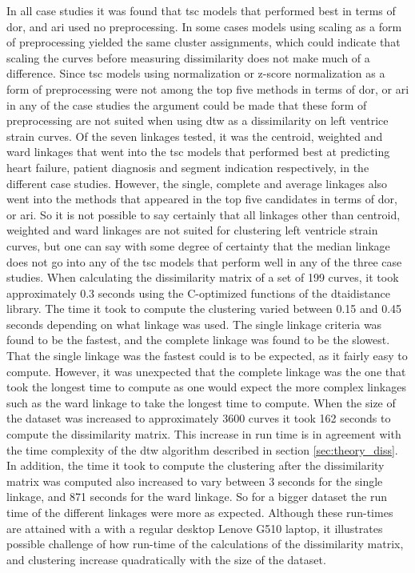 In all case studies it was found that \acrshort{tsc} models that performed best in terms of \acrshort{dor}, and \acrshort{ari} used no preprocessing. In some cases models using scaling as a form of preprocessing yielded the same cluster assignments, which could indicate that scaling the curves before measuring dissimilarity does not make much of a difference. Since \acrshort{tsc} models using normalization or z-score normalization as a form of preprocessing were not among the top five methods in terms of \acrshort{dor}, or \acrshort{ari} in any of the case studies the argument could be made that these form of preprocessing are not suited when using \acrshort{dtw} as a dissimilarity on left ventrice strain curves. \bigskip
Of the seven linkages tested, it was the centroid, weighted and ward linkages that went into the \acrshort{tsc} models that performed best at predicting heart failure, patient diagnosis and segment indication respectively, in the different case studies. However, the single, complete and average linkages also went into the methods that appeared in the top five candidates in terms of \acrshort{dor}, or \acrshort{ari}. So it is not possible to say certainly that all linkages other than centroid, weighted and ward linkages are not suited for clustering left ventricle strain curves, but one can say with some degree of certainty that the median linkage does not go into any of the \acrshort{tsc} models that perform well in any of the three case studies. \bigskip
When calculating the dissimilarity matrix of a set of 199 curves, it took approximately 0.3 seconds using the C-optimized functions of the dtaidistance library. The time it took to compute the clustering varied between 0.15 and 0.45 seconds depending on what linkage was used. The single linkage criteria was found to be the fastest, and the complete linkage was found to be the slowest. That the single linkage was the fastest could is to be expected, as it fairly easy to compute. However, it was unexpected that the complete linkage was the one that took the longest time to compute as one would expect the more complex linkages such as the ward linkage to take the longest time to compute. When the size of the dataset was increased to approximately 3600 curves it took 162 seconds to compute the dissimilarity matrix. This increase in run time is in agreement with the time complexity of the \acrshort{dtw} algorithm described in section \ref{sec:theory_diss}. In addition, the time it took to compute the clustering after the dissimilarity matrix was computed also increased to vary between 3 seconds for the single linkage, and 871 seconds for the ward linkage. So for a bigger dataset the run time of the different linkages were more as expected. Although these run-times are attained with a with a regular desktop Lenove G510 laptop, it illustrates possible challenge of how run-time of the calculations of the dissimilarity matrix, and clustering increase quadratically with the size of the dataset. \bigskip
